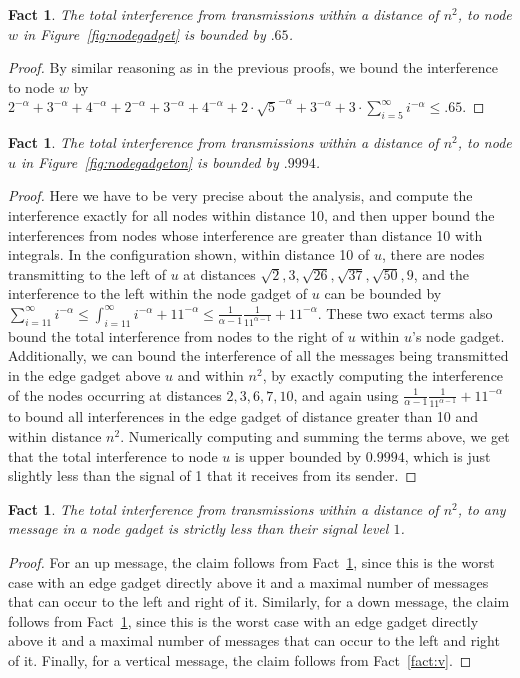 \documentclass{article}
\newtheorem{fact}[lemma]{Fact}
\begin{document}
\begin{fact}\label{fact:w}
The total interference from transmissions within a distance of $n^2$, to node $w$ in Figure~\ref{fig:nodegadget} is bounded by $.65$.
\end{fact}
\begin{proof}
By similar reasoning as in the previous proofs, we bound the interference to node $w$ by $2^{-\alpha} + 3^{-\alpha} + 4^{-\alpha} + 2^{-\alpha} + 3^{-\alpha} + 4^{-\alpha} + 2 \cdot \sqrt{5}^{-\alpha} + 3^{-\alpha} + 3 \cdot \sum_{i=5}^{\infty} i^{-\alpha} \leq .65$.
\end{proof}

\begin{fact}\label{fact:u}
The total interference from transmissions within a distance of $n^2$, to node $u$ in Figure~\ref{fig:nodegadgeton} is bounded by $.9994$.
\end{fact}
\begin{proof}
Here we have to be very precise about the analysis, and compute the interference exactly for all nodes within distance 10, and then upper bound the interferences from nodes whose interference are greater than distance 10 with integrals.  In the configuration shown, within distance 10 of $u$, there are nodes transmitting to the left of $u$ at distances $\sqrt{2}, 3, \sqrt{26}, \sqrt{37}, \sqrt{50}, 9$, and the interference to the left within the node gadget of $u$ can be bounded by $\sum_{i=11}^{\infty} i^{-\alpha} \leq \int_{i=11}^{\infty} i^{-\alpha} + 11^{-\alpha} \leq \frac{1}{\alpha-1} \frac{1}{11^{\alpha-1}} + 11^{-\alpha}$.  These two exact terms also bound the total interference from nodes to the right of $u$ within $u$'s node gadget.  Additionally, we can bound the interference of all the messages being transmitted in the edge gadget above $u$ and within $n^2$, by exactly computing the interference of the nodes occurring at distances $2, 3, 6, 7, 10$, and again using $\frac{1}{\alpha-1} \frac{1}{11^{\alpha-1}} + 11^{-\alpha}$ to bound all interferences in the edge gadget of distance greater than 10 and within distance $n^2$.  Numerically computing and summing the terms above, we get that the total interference to node $u$ is upper bounded by $0.9994$, which is just slightly less than the signal of 1 that it receives from its sender.
\end{proof}

\begin{fact}\label{fact:allnode}
The total interference from transmissions within a distance of $n^2$, to any message in a node gadget is strictly less than their signal level $1$.
\end{fact}
\begin{proof}
For an up message, the claim follows from Fact~\ref{fact:u}, since this is the worst case with an edge gadget directly above it and a maximal number of messages that can occur to the left and right of it. Similarly, for a down message, the claim follows from Fact~\ref{fact:w}, since this is the worst case with an edge gadget directly above it and a maximal number of messages that can occur to the left and right of it. Finally, for a vertical message, the claim follows from Fact~\ref{fact:v}.
\end{proof}
\end{document}
